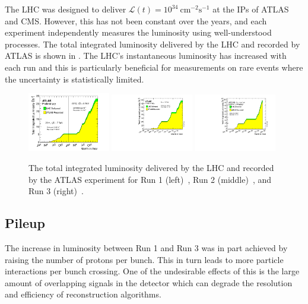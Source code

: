 The LHC was designed to deliver $\mathcal{L}(t) = 10^{34}~\unit{\centi\meter^{-2}\second^{-1}}$ at the IPs of ATLAS and CMS.
However, this has not been constant over the years, and each experiment independently measures the luminosity using well-understood processes.
The total integrated luminosity delivered by the LHC and recorded by ATLAS is shown in .
The LHC's instantaneous luminosity has increased with each run and this is particularly beneficial for measurements on rare events where the uncertainty is statistically limited.

\begin{figure}
    \centering
    \includegraphics[width=0.32\textwidth]{Figures/cern_atlas/lumi1.pdf}
    \includegraphics[width=0.32\textwidth]{Figures/cern_atlas/lumi2.pdf}
    \includegraphics[width=0.32\textwidth]{Figures/cern_atlas/lumi3.pdf}
    \caption{The total integrated luminosity delivered by the LHC and recorded by the ATLAS experiment for Run 1 (left)~\cite{run1data}, Run 2 (middle)~\cite{run2data}, and Run 3 (right)~\cite{run3data}.}
    \label{fig:luminosity}
\end{figure}

\subsection{Pileup}

The increase in luminosity between Run 1 and Run 3 was in part achieved by raising the number of protons per bunch.
This in turn leads to more particle interactions per bunch crossing.
One of the undesirable effects of this is the large amount of overlapping signals in the detector which can degrade the resolution and efficiency of reconstruction algorithms.

